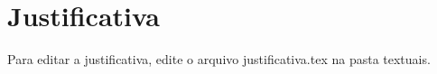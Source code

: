 \chapter{Justificativa}
Para editar a justificativa, edite o arquivo justificativa.tex na pasta textuais. 